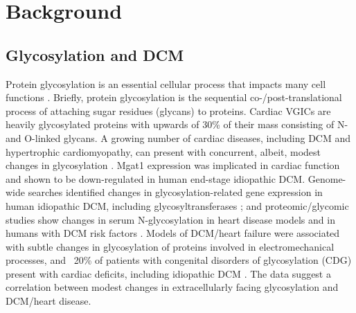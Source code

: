 \documentclass[10pt,letterpaper]{article}
\begin{document}
\section*{Background}
\subsection*{Glycosylation and DCM}
Protein glycosylation is an essential cellular process that impacts many cell functions \cite{marques2017cardiac}. Briefly, protein glycosylation is the sequential co-/post-translational process of attaching sugar residues (glycans) to proteins. Cardiac VGICs are heavily glycosylated proteins with upwards of 30\% of their mass consisting of N- and O-linked glycans. A growing number of cardiac diseases, including DCM and hypertrophic cardiomyopathy, can present with concurrent, albeit, modest changes in glycosylation \cite{gehrmann2003cardiomyopathy, footitt2009cardiomyopathy, marques2017cardiac}. Mgat1 expression was implicated in cardiac function and shown to be down-regulated in human end-stage idiopathic DCM. Genome-wide searches identified changes in glycosylation-related gene expression in human idiopathic DCM, including glycosyltransferases \cite{barrans2002global, hwang2002microarray, yung2004gene}; and proteomic/glycomic studies show changes in serum N-glycosylation in heart disease models and in humans with DCM risk factors \cite{nishio1995identification, knezevic2009variability, miura2016glycomics, nagai2016aberrant, yang2015glycoproteins}. Models of DCM/heart failure were associated with subtle changes in glycosylation of proteins involved in electromechanical processes, and ~20\% of patients with congenital disorders of glycosylation (CDG) present with cardiac deficits, including idiopathic DCM \cite{gehrmann2003cardiomyopathy, marques2017cardiac}. The data suggest a correlation between modest changes in extracellularly facing glycosylation and DCM/heart disease. 
\end{document}
